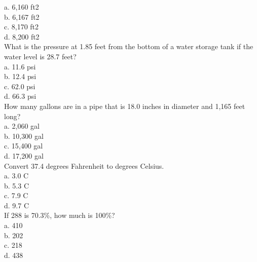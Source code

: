 a.	6,160 ft2\\
b.	6,167 ft2\\
c.	8,170 ft2\\
d.	8,200 ft2\\
What is the pressure at 1.85 feet from the bottom of a water storage tank if the water level is 28.7 feet?\\
a.	11.6 psi\\
b.	12.4 psi\\
c.	62.0 psi\\
d.	66.3 psi\\
How many gallons are in a pipe that is 18.0 inches in diameter and 1,165 feet long?\\
a.	2,060 gal\\
b.	10,300 gal\\
c.	15,400 gal\\
d.	17,200 gal\\
Convert 37.4 degrees Fahrenheit to degrees Celsius.\\
a.	3.0 C\\
b.	5.3 C\\
c.	7.9 C\\
d.	9.7 C\\
If 288 is 70.3\%, how much is 100\%?\\
a.	410\\
b.	202\\
c.	218\\
d.	438\\

